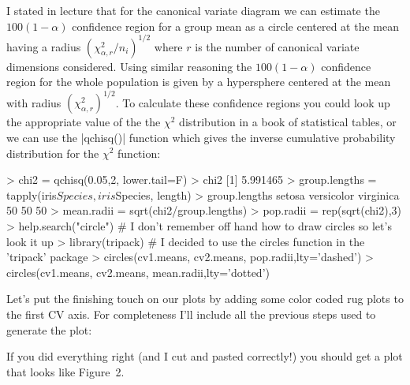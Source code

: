 I stated in lecture that for the canonical variate diagram we can estimate the $100(1-\alpha)$ confidence region for a group mean as a circle centered at the mean having a radius $(\chi^{2}_{\alpha,r}/n_i)^{1/2}$ where $r$ is the number of canonical variate dimensions considered. Using similar reasoning the $100(1-\alpha)$ confidence region for the whole population is given by a hypersphere centered at the mean with radius $(\chi^{2}_{\alpha,r})^{1/2}$.  
To calculate these confidence regions you could look up the appropriate value of the the  $\chi^2$ distribution in a book of statistical tables, or we can use the |qchisq()| function which gives the inverse cumulative probability distribution for the $\chi^2$ function:

\begin{R}
> chi2 = qchisq(0.05,2, lower.tail=F)
> chi2
[1] 5.991465
> group.lengths = tapply(iris$Species, iris$Species, length)
> group.lengths
    setosa versicolor  virginica 
        50         50         50 
> mean.radii = sqrt(chi2/group.lengths)
> pop.radii = rep(sqrt(chi2),3)
> help.search("circle")  # I don't remember off hand how to draw circles so let's look it up
> library(tripack) # I decided to use the circles function in the 'tripack' package
> circles(cv1.means, cv2.means, pop.radii,lty='dashed') 
> circles(cv1.means, cv2.means, mean.radii,lty='dotted')
\end{R}

Let's put the finishing touch on our plots by adding some color coded rug plots to the first CV axis. For completeness I'll include all the previous steps used to generate the plot:



If you did everything right (and I cut and pasted correctly!) you should get a plot that looks like Figure~2.


